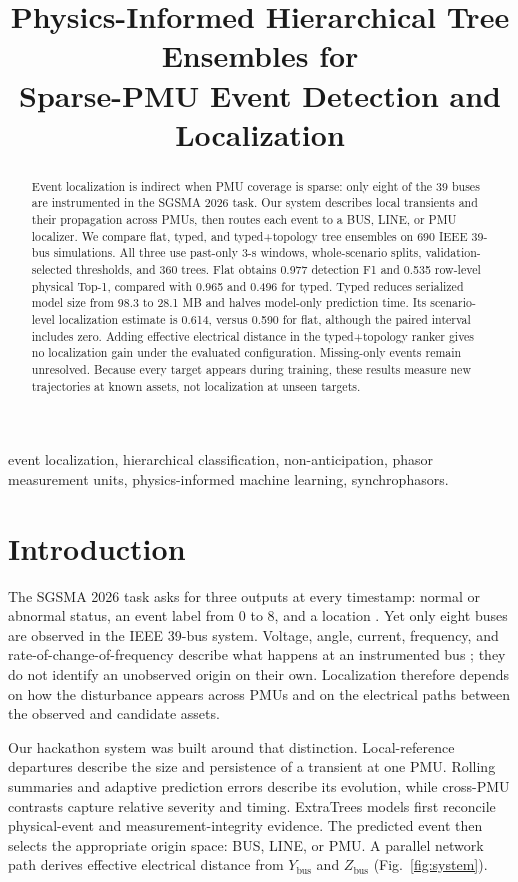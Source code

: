 \documentclass[conference]{IEEEtran}
\title{Physics-Informed Hierarchical Tree Ensembles for\\
Sparse-PMU Event Detection and Localization}
\author{
\IEEEauthorblockN{Jorge Luis Mayorga Taborda and Yessica Africano Rodriguez}
\IEEEauthorblockA{Universidad de los Andes, Bogot\'a, Colombia}
}
\begin{document}
\maketitle

\begin{abstract}
Event localization is indirect when PMU coverage is sparse: only eight of the 39 buses are instrumented in the SGSMA 2026 task. Our system describes local transients and their propagation across PMUs, then routes each event to a BUS, LINE, or PMU localizer. We compare flat, typed, and typed+topology tree ensembles on 690 IEEE 39-bus simulations. All three use past-only 3-s windows, whole-scenario splits, validation-selected thresholds, and 360 trees. Flat obtains 0.977 detection F1 and 0.535 row-level physical Top-1, compared with 0.965 and 0.496 for typed. Typed reduces serialized model size from 98.3 to 28.1 MB and halves model-only prediction time. Its scenario-level localization estimate is 0.614, versus 0.590 for flat, although the paired interval includes zero. Adding effective electrical distance in the typed+topology ranker gives no localization gain under the evaluated configuration. Missing-only events remain unresolved. Because every target appears during training, these results measure new trajectories at known assets, not localization at unseen targets.
\end{abstract}

\begin{IEEEkeywords}
event localization, hierarchical classification, non-anticipation, phasor measurement units, physics-informed machine learning, synchrophasors.
\end{IEEEkeywords}

\section{Introduction}
The SGSMA 2026 task asks for three outputs at every timestamp: normal or abnormal status, an event label from 0 to 8, and a location \cite{sgsmaGuide2026,sgsmaPolicy2026}. Yet only eight buses are observed in the IEEE 39-bus system. Voltage, angle, current, frequency, and rate-of-change-of-frequency describe what happens at an instrumented bus \cite{phadke2008,ieee2018}; they do not identify an unobserved origin on their own. Localization therefore depends on how the disturbance appears across PMUs and on the electrical paths between the observed and candidate assets.

Our hackathon system was built around that distinction. Local-reference departures describe the size and persistence of a transient at one PMU. Rolling summaries and adaptive prediction errors describe its evolution, while cross-PMU contrasts capture relative severity and timing. ExtraTrees models first reconcile physical-event and measurement-integrity evidence. The predicted event then selects the appropriate origin space: BUS, LINE, or PMU. A parallel network path derives effective electrical distance from $Y_{\mathrm{bus}}$ and $Z_{\mathrm{bus}}$ (Fig.~\ref{fig:system}).
\end{document}
